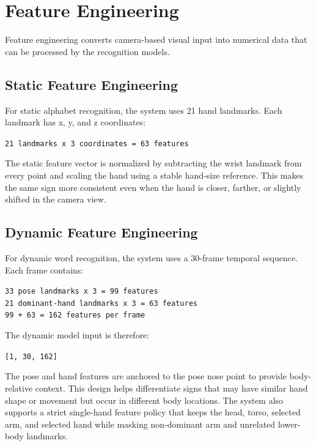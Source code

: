 \section{Feature Engineering}

Feature engineering converts camera-based visual input into numerical data that can be processed by the recognition models.

\subsection{Static Feature Engineering}

For static alphabet recognition, the system uses 21 hand landmarks. Each landmark has x, y, and z coordinates:

\begin{center}
\texttt{21 landmarks x 3 coordinates = 63 features}
\end{center}

The static feature vector is normalized by subtracting the wrist landmark from every point and scaling the hand using a stable hand-size reference. This makes the same sign more consistent even when the hand is closer, farther, or slightly shifted in the camera view.

\subsection{Dynamic Feature Engineering}

For dynamic word recognition, the system uses a 30-frame temporal sequence. Each frame contains:

\begin{center}
\texttt{33 pose landmarks x 3 = 99 features} \\
\texttt{21 dominant-hand landmarks x 3 = 63 features} \\
\texttt{99 + 63 = 162 features per frame}
\end{center}

The dynamic model input is therefore:

\begin{center}
\texttt{[1, 30, 162]}
\end{center}

The pose and hand features are anchored to the pose nose point to provide body-relative context. This design helps differentiate signs that may have similar hand shape or movement but occur in different body locations. The system also supports a strict single-hand feature policy that keeps the head, torso, selected arm, and selected hand while masking non-dominant arm and unrelated lower-body landmarks.


